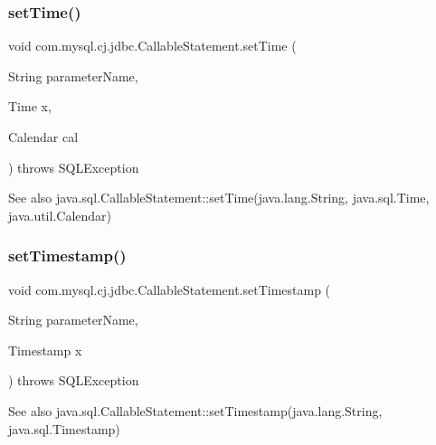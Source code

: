 \subsubsection{\texorpdfstring{set\+Time()}{setTime()}\hspace{0.1cm}{\footnotesize\ttfamily [2/2]}}
{\footnotesize\ttfamily void com.\+mysql.\+cj.\+jdbc.\+Callable\+Statement.\+set\+Time (\begin{DoxyParamCaption}\item[{String}]{parameter\+Name,  }\item[{Time}]{x,  }\item[{Calendar}]{cal }\end{DoxyParamCaption}) throws S\+Q\+L\+Exception}

\begin{DoxySeeAlso}{See also}
java.\+sql.\+Callable\+Statement\+::set\+Time(java.\+lang.\+String, java.\+sql.\+Time, java.\+util.\+Calendar) 
\end{DoxySeeAlso}
\mbox{\label{classcom_1_1mysql_1_1cj_1_1jdbc_1_1_callable_statement_a5032ac718b4fbbb1cfd23077cc37ec20}} 
\subsubsection{\texorpdfstring{set\+Timestamp()}{setTimestamp()}\hspace{0.1cm}{\footnotesize\ttfamily [1/2]}}
{\footnotesize\ttfamily void com.\+mysql.\+cj.\+jdbc.\+Callable\+Statement.\+set\+Timestamp (\begin{DoxyParamCaption}\item[{String}]{parameter\+Name,  }\item[{Timestamp}]{x }\end{DoxyParamCaption}) throws S\+Q\+L\+Exception}

\begin{DoxySeeAlso}{See also}
java.\+sql.\+Callable\+Statement\+::set\+Timestamp(java.\+lang.\+String, java.\+sql.\+Timestamp) 
\end{DoxySeeAlso}
\mbox{\label{classcom_1_1mysql_1_1cj_1_1jdbc_1_1_callable_statement_adeaf8f538114ab776d3f9063134709a7}} 
